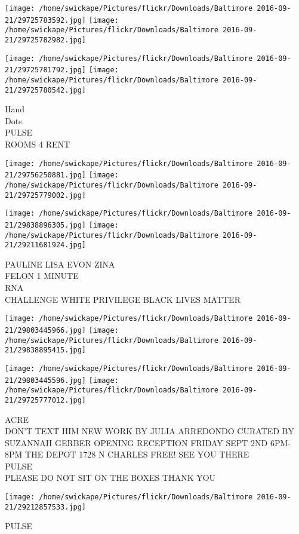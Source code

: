 \documentclass[10pt,letterpaper]{article}
\begin{document}
\texttt{[image: /home/swickape/Pictures/flickr/Downloads/Baltimore 2016-09-21/29725783592.jpg]}
\texttt{[image: /home/swickape/Pictures/flickr/Downloads/Baltimore 2016-09-21/29725782982.jpg]}

\texttt{[image: /home/swickape/Pictures/flickr/Downloads/Baltimore 2016-09-21/29725781792.jpg]}
\texttt{[image: /home/swickape/Pictures/flickr/Downloads/Baltimore 2016-09-21/29725780542.jpg]}

Hand\\
Dots\\
PULSE\\
ROOMS 4 RENT
\pagebreak

\texttt{[image: /home/swickape/Pictures/flickr/Downloads/Baltimore 2016-09-21/29756250881.jpg]}
\texttt{[image: /home/swickape/Pictures/flickr/Downloads/Baltimore 2016-09-21/29725779002.jpg]}

\texttt{[image: /home/swickape/Pictures/flickr/Downloads/Baltimore 2016-09-21/29838896305.jpg]}
\texttt{[image: /home/swickape/Pictures/flickr/Downloads/Baltimore 2016-09-21/29211681924.jpg]}

PAULINE LISA EVON ZINA\\
FELON 1 MINUTE\\
RNA\\
CHALLENGE WHITE PRIVILEGE BLACK LIVES MATTER
\pagebreak

\texttt{[image: /home/swickape/Pictures/flickr/Downloads/Baltimore 2016-09-21/29803445966.jpg]}
\texttt{[image: /home/swickape/Pictures/flickr/Downloads/Baltimore 2016-09-21/29838895415.jpg]}

\texttt{[image: /home/swickape/Pictures/flickr/Downloads/Baltimore 2016-09-21/29803445596.jpg]}
\texttt{[image: /home/swickape/Pictures/flickr/Downloads/Baltimore 2016-09-21/29725777012.jpg]}

ACRE\\
DON'T TEXT HIM NEW WORK BY JULIA ARREDONDO CURATED BY SUZANNAH GERBER OPENING RECEPTION FRIDAY SEPT 2ND 6PM{-}8PM THE DEPOT 1728 N CHARLES FREE! SEE YOU THERE\\
PULSE\\
PLEASE DO NOT SIT ON THE BOXES THANK YOU
\pagebreak

\texttt{[image: /home/swickape/Pictures/flickr/Downloads/Baltimore 2016-09-21/29212857533.jpg]}

PULSE
\pagebreak
\end{document}
